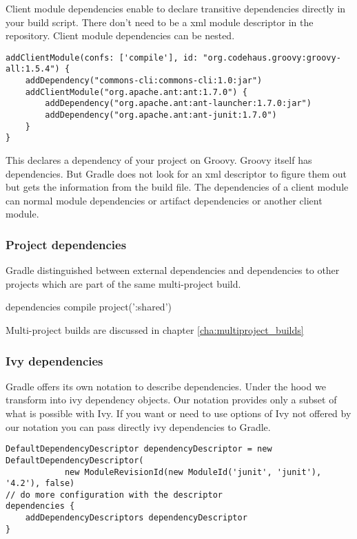 Client module dependencies enable to declare transitive dependencies directly in your build script. There don't need to be a xml module descriptor in the repository. Client module dependencies can be nested.

\begin{Verbatim}
addClientModule(confs: ['compile'], id: "org.codehaus.groovy:groovy-all:1.5.4") {
    addDependency("commons-cli:commons-cli:1.0:jar")
    addClientModule("org.apache.ant:ant:1.7.0") {
        addDependency("org.apache.ant:ant-launcher:1.7.0:jar")
        addDependency("org.apache.ant:ant-junit:1.7.0")
    }
}
\end{Verbatim}

This declares a dependency of your project on Groovy. Groovy itself has dependencies. But Gradle does not look for an xml descriptor to figure them out but gets the information from the build file. The dependencies of a client module can normal module dependencies or artifact dependencies or another client module. 

\subsubsection{Project dependencies} %
\label{ssub:project_dependencies}

Gradle distinguished between external dependencies and dependencies to other projects which are part of the same multi-project build. 

dependencies {
    compile project(':shared')
}

Multi-project builds are discussed in chapter \ref{cha:multiproject_builds}

\subsubsection{Ivy dependencies} %
\label{ssub:ivy_dependencies}

Gradle offers its own notation to describe dependencies. Under the hood we transform into ivy dependency objects. Our notation provides only a subset of what is possible with Ivy. If you want or need to use options of Ivy not offered by our notation you can pass directly ivy dependencies to Gradle.

\begin{Verbatim}
DefaultDependencyDescriptor dependencyDescriptor = new DefaultDependencyDescriptor(
	        new ModuleRevisionId(new ModuleId('junit', 'junit'), '4.2'), false)
// do more configuration with the descriptor
dependencies {
	addDependencyDescriptors dependencyDescriptor 
}
\end{Verbatim}

